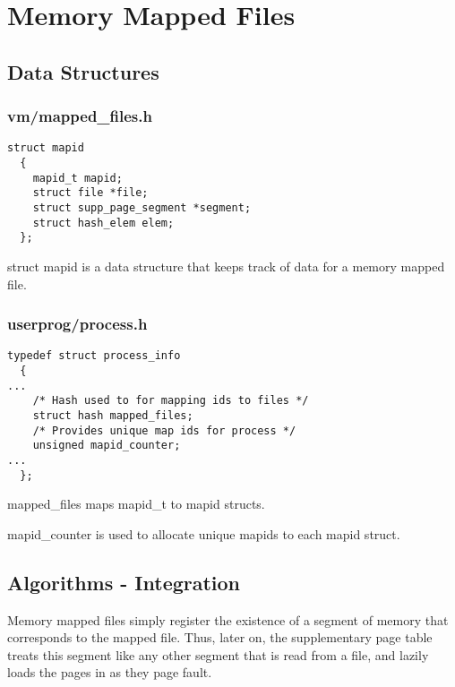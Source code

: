 \section{Memory Mapped Files}

\subsection{Data Structures}


\subsubsection*{vm/mapped\_files.h}

\begin{verbatim}
struct mapid
  {
    mapid_t mapid;
    struct file *file;
    struct supp_page_segment *segment;
    struct hash_elem elem;
  };
\end{verbatim}

struct mapid is a data structure that keeps track of data for a memory mapped
file.

\subsubsection*{userprog/process.h}

\begin{verbatim}
typedef struct process_info
  {
...
    /* Hash used to for mapping ids to files */
    struct hash mapped_files;
    /* Provides unique map ids for process */
    unsigned mapid_counter;
...
  };
\end{verbatim}

mapped\_files maps mapid\_t to mapid structs.

mapid\_counter is used to allocate unique mapids to each mapid struct.

\subsection{Algorithms - Integration}


Memory mapped files simply register the existence of a segment of memory that
corresponds to the mapped file. Thus, later on, the supplementary page table treats
this segment like any other segment that is read from a file, and lazily loads
the pages in as they page fault.

